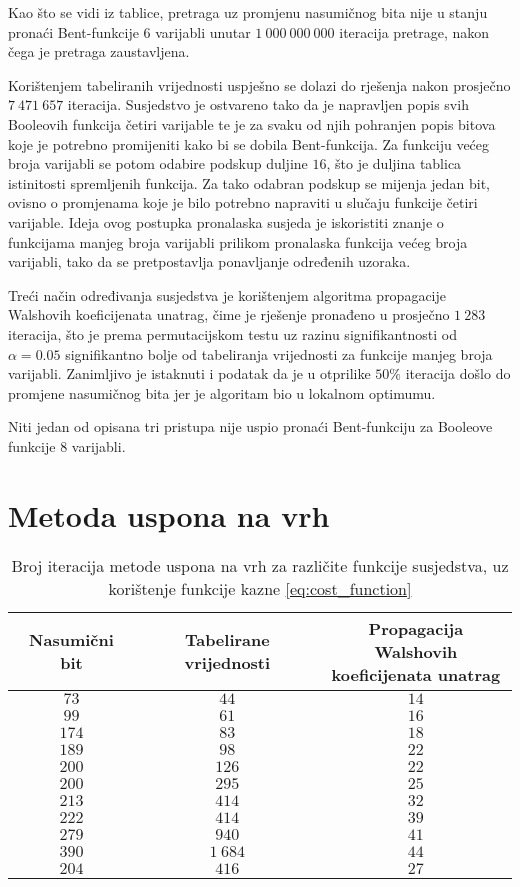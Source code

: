 Kao što se vidi iz tablice, pretraga uz promjenu nasumičnog bita nije u stanju pronaći Bent-funkcije $6$ varijabli unutar $1\:000\:000\:000$ iteracija pretrage, nakon čega je pretraga zaustavljena.

Korištenjem tabeliranih vrijednosti uspješno se dolazi do rješenja nakon prosječno $7\:471\:657$ iteracija.
Susjedstvo je ostvareno tako da je napravljen popis svih Booleovih funkcija četiri varijable te je za svaku od njih pohranjen popis bitova koje je potrebno promijeniti kako bi se dobila Bent-funkcija.
Za funkciju većeg broja varijabli se potom odabire podskup duljine $16$, što je duljina tablica istinitosti spremljenih funkcija.
Za tako odabran podskup se mijenja jedan bit, ovisno o promjenama koje je bilo potrebno napraviti u slučaju funkcije četiri varijable.
Ideja ovog postupka pronalaska susjeda je iskoristiti znanje o funkcijama manjeg broja varijabli prilikom pronalaska funkcija većeg broja varijabli, tako da se pretpostavlja ponavljanje određenih uzoraka.

Treći način određivanja susjedstva je korištenjem algoritma propagacije Walshovih koeficijenata unatrag, čime je rješenje pronađeno u prosječno $1\:283$ iteracija, što je prema permutacijskom testu uz razinu signifikantnosti od $\alpha = 0.05$ signifikantno bolje od tabeliranja vrijednosti za funkcije manjeg broja varijabli.
Zanimljivo je istaknuti i podatak da je u otprilike $50\%$ iteracija došlo do promjene nasumičnog bita jer je algoritam bio u lokalnom optimumu.

Niti jedan od opisana tri pristupa nije uspio pronaći Bent-funkciju za Booleove funkcije $8$ varijabli.

\section{Metoda uspona na vrh}
\begin{table}[]
    \centering
    \captionsetup{justification=centering}
    \caption{Broj iteracija metode uspona na vrh za različite funkcije susjedstva, uz korištenje funkcije kazne \eqref{eq:cost_function}}
    \begin{tabular}{ccc} \hline
        Nasumični bit & Tabelirane vrijednosti & \makecell{Propagacija Walshovih \\ koeficijenata unatrag} \\ \hline
         $73$ &     $44$ & $14$ \\
         $99$ &     $61$ & $16$ \\
        $174$ &     $83$ & $18$ \\
        $189$ &     $98$ & $22$ \\
        $200$ &    $126$ & $22$ \\
        $200$ &    $295$ & $25$ \\
        $213$ &    $414$ & $32$ \\
        $222$ &    $414$ & $39$ \\
        $279$ &    $940$ & $41$ \\
        $390$ & $1\:684$ & $44$ \\ \hline
        $204$ &    $416$ & $27$
    \end{tabular}
    \label{tbl:greedy_6}
\end{table}

